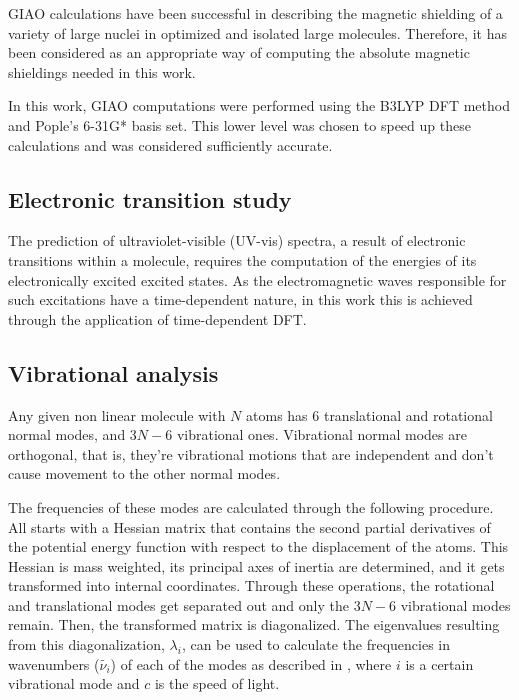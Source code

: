 GIAO calculations have been successful in describing the magnetic shielding of a variety of large nuclei in optimized and isolated large molecules. Therefore, it has been considered as an appropriate way of computing the absolute magnetic shieldings needed in this work.

In this work, GIAO computations were performed using the B3LYP DFT method and Pople's 6-31G* basis set.
This lower level was chosen to speed up these calculations and was considered sufficiently accurate.

\subsection{Electronic transition study}
The prediction of ultraviolet-visible (UV-vis) spectra, a result of electronic transitions within a molecule, requires the computation of the energies of its electronically excited excited states.
As the electromagnetic waves responsible for such excitations have a time-dependent nature, in this work this is achieved through the application of time-dependent DFT.

\subsection{Vibrational analysis}
Any given non linear molecule with $N$ atoms has 6 translational and rotational normal modes, and $3N-6$ vibrational ones.
Vibrational normal modes are orthogonal, that is, they're vibrational motions that are independent and don't cause movement to the other normal modes.

The frequencies of these modes are calculated through the following procedure.
All starts with a Hessian matrix that contains the second partial derivatives of the potential energy function with respect to the displacement of the atoms.
This Hessian is mass weighted, its principal axes of inertia are determined, and it gets transformed into internal coordinates.
Through these operations, the rotational and translational modes get separated out and only the $3N-6$ vibrational modes remain.
Then, the transformed matrix is diagonalized.
The eigenvalues resulting from this diagonalization, $\lambda_i$, can be used to calculate the frequencies in wavenumbers ($\tilde{\nu_i}$) of each of the modes as described in , where $i$ is a certain vibrational mode and $c$ is the speed of light.

